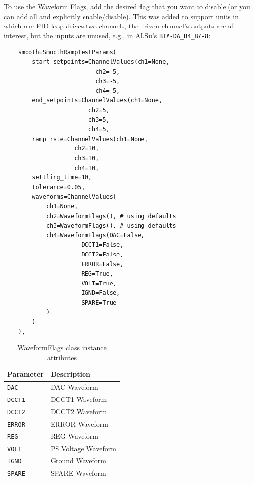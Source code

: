 \newpage
To use the Waveform Flags, add the desired flag that you want to disable (or you can add all and explicitly enable/disable). This was added to support units in which one PID loop drives two channels, the driven channel's outputs are of interest, but the inputs are unused, e.g., in ALSu's \texttt{BTA-DA\_B4\_B7-8}:
\begin{verbatim}
	smooth=SmoothRampTestParams(
		start_setpoints=ChannelValues(ch1=None,
					      ch2=-5,
					      ch3=-5,
					      ch4=-5,
		end_setpoints=ChannelValues(ch1=None,
					    ch2=5,
					    ch3=5,
					    ch4=5,
		ramp_rate=ChannelValues(ch1=None,
					ch2=10,
					ch3=10,
					ch4=10,
		settling_time=10,
		tolerance=0.05,
		waveforms=ChannelValues(
			ch1=None,            
			ch2=WaveformFlags(), # using defaults
			ch3=WaveformFlags(), # using defaults
			ch4=WaveformFlags(DAC=False,
					  DCCT1=False,
					  DCCT2=False,
					  ERROR=False,
					  REG=True,
					  VOLT=True,
					  IGND=False,
					  SPARE=True
			)
		)
	),
\end{verbatim}

\begin{table}[H]
	\centering
	\begin{tabular}{p{4cm}p{10cm}}
		\toprule
		\textbf{Parameter} & \textbf{Description} \\
		\midrule
		
		\texttt{DAC} &
		DAC Waveform\\
		
		\texttt{DCCT1} &
		DCCT1 Waveform\\
		
		\texttt{DCCT2} &
		DCCT2 Waveform\\
		
		\texttt{ERROR} &
		ERROR Waveform\\
		
		\texttt{REG} &
		REG Waveform\\
		
		\texttt{VOLT} &
		PS Voltage Waveform\\
		
		\texttt{IGND} &
		Ground Waveform\\
		
		\texttt{SPARE} &
		SPARE Waveform\\
		
		\bottomrule
	\end{tabular}
	\caption{WaveformFlags class instance attributes}
	\label{tab:WaveformFlags}
\end{table}

